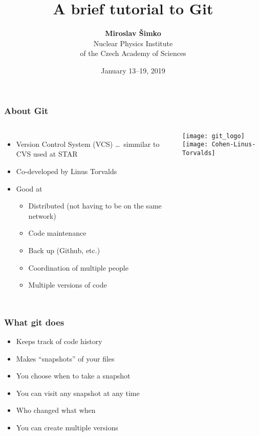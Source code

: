 \documentclass{beamer}
\title[WEJ\v CF -- B\' il\' y Potok]{A brief tutorial to Git}
\author[M. \v Simko]{\textbf{Miroslav \v Simko} \\
Nuclear Physics Institute \\
of the Czech Academy of Sciences}
\date{January 13--19, 2019}
\begin{document}
\begin{frame}%
 \titlepage
\end{frame}


\begin{frame}%
\frametitle{About Git}
\begin{columns}
\begin{itemize}
\item Version Control System (VCS) \dots~simmilar to CVS used at STAR
\item Co-developed by Linus Torvalds \pause
\item Good at
\begin{itemize}
\item Distributed (not having to be on the same network)
\item Code maintenance
\item Back up (Github, etc.)
\item Coordination of multiple people
\item Multiple versions of code
\end{itemize}
\end{itemize}

\texttt{[image: git\_logo]}\\[.5cm]
\texttt{[image: Cohen-Linus-Torvalds]}
\end{columns}


 
\end{frame}
\begin{frame}[fragile]
\frametitle{What git does}
\begin{itemize}
 \item Keeps track of code history
 \item Makes ``snapshots'' of your files\pause
 \item You choose when to take a snapshot
 \item You can visit any snapshot at any time
 \item Who changed what when
 \item You can create multiple versions
\end{itemize}

\end{frame}
\end{document}

